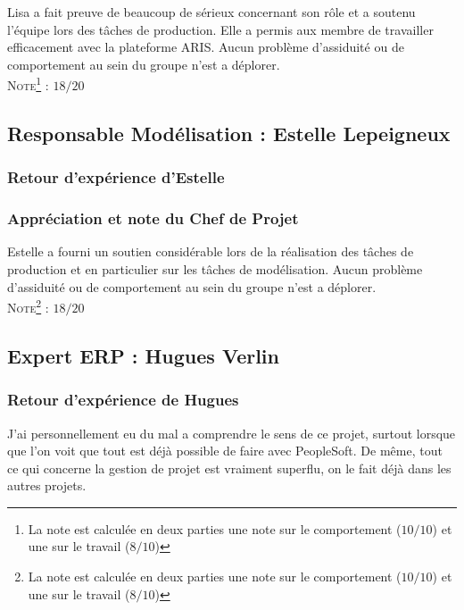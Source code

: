 Lisa a fait preuve de beaucoup de sérieux concernant son rôle et a soutenu l’équipe lors des tâches de production. Elle a permis aux membre de travailler efficacement avec la plateforme ARIS. Aucun problème d’assiduité ou de comportement au sein du groupe n’est a déplorer.\\

\noindent\textsc{Note\footnote{La note est calculée en deux parties une note sur le comportement ($10/10$) et une sur le travail ($8/10$)} :} $18/20$

\subsection{Responsable Modélisation : Estelle Lepeigneux}

\subsubsection{Retour d'expérience d'Estelle}


\subsubsection{Appréciation et note du Chef de Projet}

Estelle a fourni un soutien considérable lors de la réalisation des tâches de production et en particulier sur les tâches de modélisation. Aucun problème d’assiduité ou de comportement au sein du groupe n’est a déplorer.\\

\noindent\textsc{Note\footnote{La note est calculée en deux parties une note sur le comportement ($10/10$) et une sur le travail ($8/10$)} :} $18/20$

\subsection{Expert ERP : Hugues Verlin}

\subsubsection{Retour d'expérience de Hugues}

J'ai personnellement eu du mal a comprendre le sens de ce projet, surtout lorsque que l’on voit que tout est déjà possible de faire avec PeopleSoft. De même, tout ce qui concerne la gestion de projet est vraiment superflu, on le fait déjà dans les autres projets. \\

